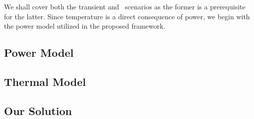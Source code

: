 We shall cover both the transient and \dss\ scenarios as the former is a prerequisite for the latter.
Since temperature is a direct consequence of power, we begin with the power model utilized in the proposed framework.

\subsection{Power Model} 


\subsection{Thermal Model} 


\subsection{Our Solution} 

